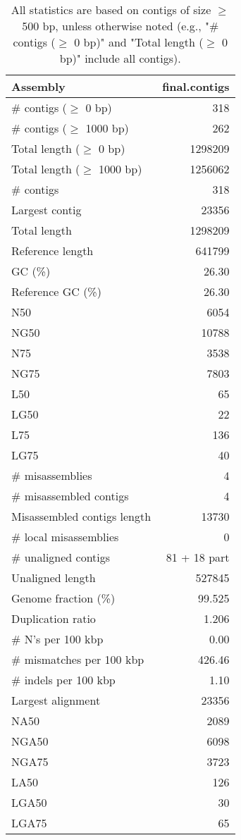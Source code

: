 \documentclass[12pt,a4paper]{article}
\begin{document}
\begin{table}[ht]
\begin{center}
\caption{All statistics are based on contigs of size $\geq$ 500 bp, unless otherwise noted (e.g., "\# contigs ($\geq$ 0 bp)" and "Total length ($\geq$ 0 bp)" include all contigs).}
\begin{tabular}{|l*{1}{|r}|}
\hline
Assembly & final.contigs \\ \hline
\# contigs ($\geq$ 0 bp) & 318 \\ \hline
\# contigs ($\geq$ 1000 bp) & 262 \\ \hline
Total length ($\geq$ 0 bp) & 1298209 \\ \hline
Total length ($\geq$ 1000 bp) & 1256062 \\ \hline
\# contigs & 318 \\ \hline
Largest contig & 23356 \\ \hline
Total length & 1298209 \\ \hline
Reference length & 641799 \\ \hline
GC (\%) & 26.30 \\ \hline
Reference GC (\%) & 26.30 \\ \hline
N50 & 6054 \\ \hline
NG50 & 10788 \\ \hline
N75 & 3538 \\ \hline
NG75 & 7803 \\ \hline
L50 & 65 \\ \hline
LG50 & 22 \\ \hline
L75 & 136 \\ \hline
LG75 & 40 \\ \hline
\# misassemblies & 4 \\ \hline
\# misassembled contigs & 4 \\ \hline
Misassembled contigs length & 13730 \\ \hline
\# local misassemblies & 0 \\ \hline
\# unaligned contigs & 81 + 18 part \\ \hline
Unaligned length & 527845 \\ \hline
Genome fraction (\%) & 99.525 \\ \hline
Duplication ratio & 1.206 \\ \hline
\# N's per 100 kbp & 0.00 \\ \hline
\# mismatches per 100 kbp & 426.46 \\ \hline
\# indels per 100 kbp & 1.10 \\ \hline
Largest alignment & 23356 \\ \hline
NA50 & 2089 \\ \hline
NGA50 & 6098 \\ \hline
NGA75 & 3723 \\ \hline
LA50 & 126 \\ \hline
LGA50 & 30 \\ \hline
LGA75 & 65 \\ \hline
\end{tabular}
\end{center}
\end{table}
\end{document}
